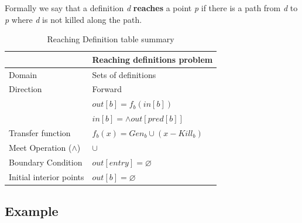 \documentclass{article}
\begin{document}
Formally we say that a definition \textit{d} \textbf{reaches} a point \textit{p} if there is a path from \textit{d} to \textit{p} where \textit{d} is not killed along the path.

\begin{table}[H]
\centering
\begin{tabular}{|p{}|p{}|}
\hline
 & \textbf{Reaching definitions problem} \\
\hline
Domain & Sets of definitions \\
\hline
Direction & Forward \\
 & $out[b] = f_b(in[b])$ \\
 & $in[b] = \wedge out[pred[b]]$ \\
\hline
Transfer function & $f_b(x) = Gen_b \cup (x - Kill_b)$ \\
\hline
Meet Operation ($\wedge$) & $\cup$ \\
\hline
Boundary Condition & $out[entry] = \varnothing$  \\
\hline
Initial interior points & $out[b] = \varnothing$  \\
\hline
\end{tabular}
\caption{Reaching Definition table summary}
\label{tab:dataflow_problem_x}
\end{table}

\subsection{Example}
\end{document}

